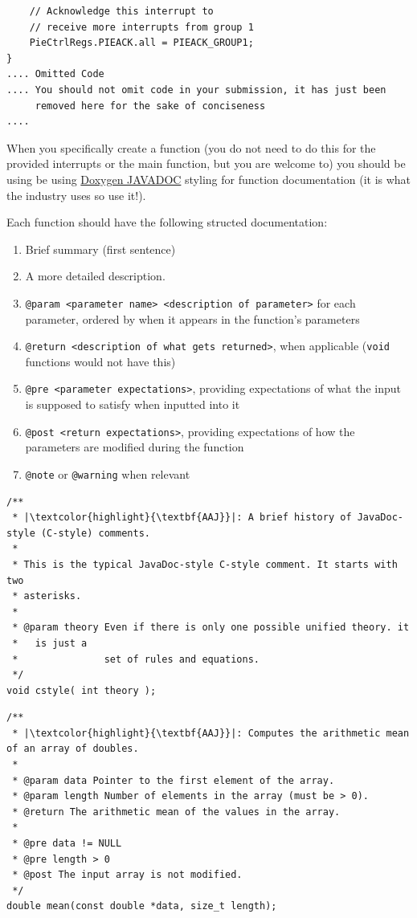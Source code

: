 \documentclass[11pt]{article}
\begin{document}
\begin{verbatim}
    // Acknowledge this interrupt to
    // receive more interrupts from group 1
    PieCtrlRegs.PIEACK.all = PIEACK_GROUP1;
}
.... Omitted Code
.... You should not omit code in your submission, it has just been
     removed here for the sake of conciseness
....
\end{verbatim}

\newpage
%

When you specifically create a function (you do not need to do this for the provided interrupts or the main function, but you are welcome to) you should be using be using \href{https://www.doxygen.nl/manual/docblocks.html}{Doxygen JAVADOC} styling for function documentation (it is what the industry uses so use it!).

Each function should have the following structed documentation:

\begin{enumerate}
    \item Brief summary (first sentence)
    \item A more detailed description.
    \item \lstinline{@param <parameter name> <description of parameter>} for each parameter, ordered by when it appears in the function's parameters
        \item \lstinline{@return <description of what gets returned>}, when applicable (\texttt{void} functions would not have this)
    \item \lstinline{@pre <parameter expectations>}, providing expectations of what the input is supposed to satisfy when inputted into it
    \item \lstinline{@post <return expectations>}, providing expectations of how the parameters are modified during the function
    \item \lstinline{@note} or \lstinline{@warning} when relevant
\end{enumerate}

\begin{verbatim}
/**
 * |\textcolor{highlight}{\textbf{AAJ}}|: A brief history of JavaDoc-style (C-style) comments.
 *
 * This is the typical JavaDoc-style C-style comment. It starts with two
 * asterisks.
 *
 * @param theory Even if there is only one possible unified theory. it
 *   is just a
 *               set of rules and equations.
 */
void cstyle( int theory );
\end{verbatim}

\begin{verbatim}
/**
 * |\textcolor{highlight}{\textbf{AAJ}}|: Computes the arithmetic mean of an array of doubles.
 *
 * @param data Pointer to the first element of the array.
 * @param length Number of elements in the array (must be > 0).
 * @return The arithmetic mean of the values in the array.
 *
 * @pre data != NULL
 * @pre length > 0
 * @post The input array is not modified.
 */
double mean(const double *data, size_t length);
\end{verbatim}
\end{document}

